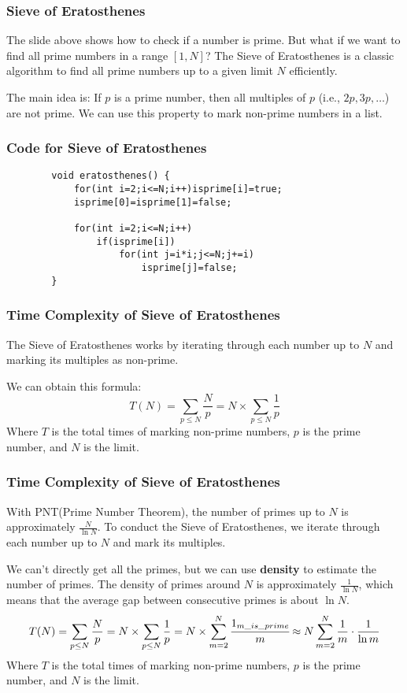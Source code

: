 \documentclass[xcolor=dvipsnames]{beamer}
\begin{document}
    \begin{frame}
        \frametitle{Sieve of Eratosthenes}
        The slide above shows how to check if a number is prime. But what if we want to find all prime numbers in a range $[1, N]$?
        The Sieve of Eratosthenes is a classic algorithm to find all prime numbers up to a given limit $N$ efficiently.

        The main idea is: If $p$ is a prime number, then all multiples of $p$ (i.e., $2p, 3p, \ldots$) are not prime. We can use this property to mark non-prime numbers in a list.
    \end{frame}

    \begin{frame}[fragile]
        \frametitle{Code for Sieve of Eratosthenes}
        \begin{verbatim}
        void eratosthenes() {
            for(int i=2;i<=N;i++)isprime[i]=true;
            isprime[0]=isprime[1]=false;
            
            for(int i=2;i<=N;i++)
                if(isprime[i])
                    for(int j=i*i;j<=N;j+=i)
                        isprime[j]=false;
        }
        \end{verbatim}
    \end{frame}

    \begin{frame}
        \frametitle{Time Complexity of Sieve of Eratosthenes}
        The Sieve of Eratosthenes works by iterating through each number up to $N$ and marking its multiples as non-prime. 

        We can obtain this formula:
        $$
        T(N) = \displaystyle\sum_{p \leq N} \frac{N}{p} = N\times \displaystyle\sum_{p \leq N} \frac{1}{p}
        $$
        Where $T$ is the total times of marking non-prime numbers, $p$ is the prime number, and $N$ is the limit.
    \end{frame}
   
    \begin{frame}
        \frametitle{Time Complexity of Sieve of Eratosthenes}
        With PNT(Prime Number Theorem), the number of primes up to $N$ is approximately $\frac{N}{\ln N}$. To conduct the Sieve of Eratosthenes, we iterate through each number up to $N$ and mark its multiples.

        We can't directly get all the primes, but we can use \textbf{density} to estimate the number of primes. The density of primes around $N$ is approximately $\frac{1}{\ln N}$, which means that the average gap between consecutive primes is about $\ln N$.
        $$
        T(N) = \displaystyle\sum_{p \leq N} \frac{N}{p} = N\times \displaystyle\sum_{p \leq N} \frac{1}{p} = N\times \displaystyle\sum_{m=2}^{N}\cfrac{1_{m\_is\_prime}}{m}\approx N \displaystyle\sum_{m=2}^{N} \frac{1}{m}\cdot\frac{1}{\ln m}
        $$
        Where $T$ is the total times of marking non-prime numbers, $p$ is the prime number, and $N$ is the limit.
    \end{frame}
    
\end{document}
